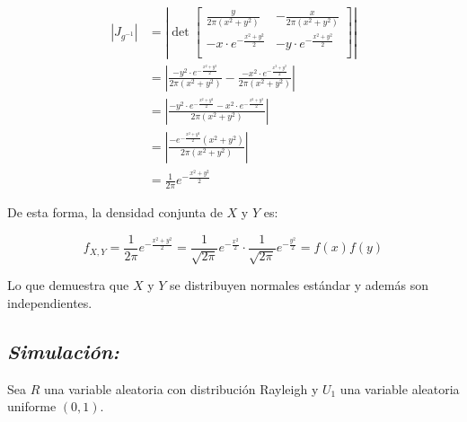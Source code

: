 \documentclass[]{article}
\begin{document}
\begin{equation}
\begin{split}
\left| J_{g^{-1}}  \right|
&=\left| \det 
\begin{bmatrix} 
\frac{y}{2\pi(x^2+y^2)} &  -\frac{x}{2\pi(x^2+y^2)} \\
-x\cdot e^{-\frac{x^2+y^2}{2}} &  -y\cdot e^{-\frac{x^2+y^2}{2}} \\
\end{bmatrix}  \right|\\
&=
\left|
\frac{-y^2\cdot e^{-\frac{x^2+y^2}{2}}}{2\pi(x^2+y^2)}-
\frac{-x^2\cdot e^{-\frac{x^2+y^2}{2}}}{2\pi(x^2+y^2)}
\right|\\
&=
\left|
\frac{-y^2\cdot e^{-\frac{x^2+y^2}{2}}-x^2\cdot e^{-\frac{x^2+y^2}{2}}}{2\pi(x^2+y^2)}
\right|\\
&=
\left|
\frac{-e^{-\frac{x^2+y^2}{2}}(x^2+y^2)}{2\pi(x^2+y^2)}
\right|\\
&=
\frac{1}{2\pi}e^{-\frac{x^2+y^2}{2}}
\end{split}
\end{equation}

De esta forma, la densidad conjunta de \(X\) y \(Y\) es:

\begin{equation}
f_{X,Y}=\frac{1}{2\pi}e^{-\frac{x^2+y^2}{2}}=\frac{1}{\sqrt{2\pi}}e^{-\frac{x^2}{2}} \cdot \frac{1}{\sqrt{2\pi}}e^{-\frac{y^2}{2}}=f(x)f(y)
\end{equation}

Lo que demuestra que \(X\) y \(Y\) se distribuyen normales estándar y
además son independientes.

\subsection{\texorpdfstring{\emph{Simulación:}}{Simulación:}}\label{simulacion-3}

Sea \(R\) una variable aleatoria con distribución Rayleigh y \(U_1\) una
variable aleatoria uniforme \((0,1)\).
\end{document}
